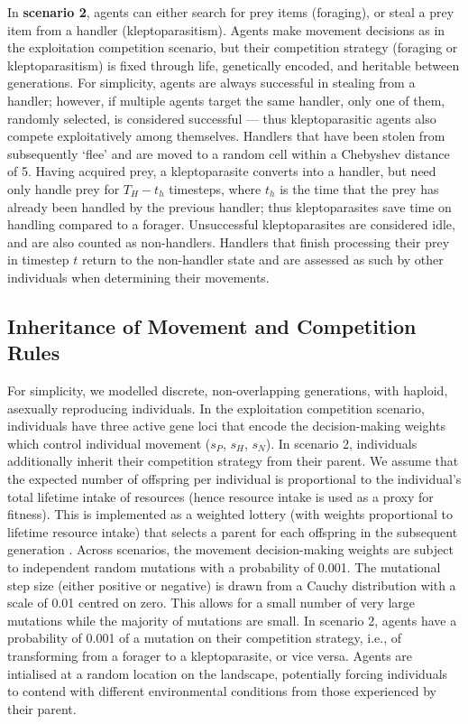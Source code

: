In \textbf{scenario 2}, agents can either search for prey items (foraging), or steal a prey item from a handler (kleptoparasitism).
Agents make movement decisions as in the exploitation competition scenario, but their competition strategy (foraging or kleptoparasitism) is fixed through life, genetically encoded, and heritable between generations.
For simplicity, agents are always successful in stealing from a handler; however, if multiple agents target the same handler, only one of them, randomly selected, is considered successful --- thus kleptoparasitic agents also compete exploitatively among themselves.
Handlers that have been stolen from subsequently `flee' and are moved to a random cell within a Chebyshev distance of 5.
Having acquired prey, a kleptoparasite converts into a handler, but need only handle prey for $T_H - t_h$ timesteps, where $t_h$ is the time that the prey has already been handled by the previous handler; thus kleptoparasites save time on handling compared to a forager.
Unsuccessful kleptoparasites are considered idle, and are also counted as non-handlers.
Handlers that finish processing their prey in timestep $t$ return to the non-handler state and are assessed as such by other individuals when determining their movements.

\subsection*{Inheritance of Movement and Competition Rules}

For simplicity, we modelled discrete, non-overlapping generations, with haploid, asexually reproducing individuals.
In the exploitation competition scenario, individuals have three active gene loci that encode the decision-making weights which control individual movement ($s_P$, $s_H$, $s_N$). 
In scenario 2, individuals additionally inherit their competition strategy from their parent.
We assume that the expected number of offspring per individual is proportional to the individual's total lifetime intake of resources (hence resource intake is used as a proxy for fitness). 
This is implemented as a weighted lottery (with weights proportional to lifetime resource intake) that selects a parent for each offspring in the subsequent generation \citep[see prior implementation in][]{netz2021}.
Across scenarios, the movement decision-making weights are subject to independent random mutations with a probability of 0.001.
The mutational step size (either positive or negative) is drawn from a Cauchy distribution with a scale of 0.01 centred on zero.
This allows for a small number of very large mutations while the majority of mutations are small.
In scenario 2, agents have a probability of 0.001 of a mutation on their competition strategy, i.e., of transforming from a forager to a kleptoparasite, or vice versa.
Agents are intialised at a random location on the landscape, potentially forcing individuals to contend with different environmental conditions from those experienced by their parent.

